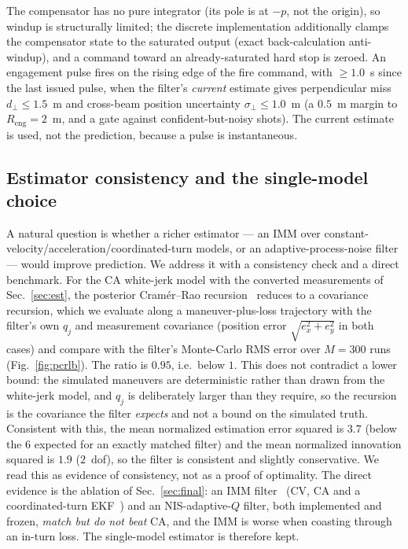 \documentclass[conference]{IEEEtran}
\begin{document}
The compensator has no pure integrator (its pole is at $-p$, not the origin), so windup is structurally limited; the discrete implementation additionally clamps the compensator state to the saturated output (exact back-calculation anti-windup), and a command toward an already-saturated hard stop is zeroed. An engagement pulse fires on the rising edge of the fire command, with $\ge1.0$~s since the last issued pulse, when the filter's \emph{current} estimate gives perpendicular miss $d_\perp\le1.5$~m and cross-beam position uncertainty $\sigma_\perp\le1.0$~m (a $0.5$~m margin to $R_{\mathrm{eng}}=2$~m, and a gate against confident-but-noisy shots). The current estimate is used, not the prediction, because a pulse is instantaneous.

\subsection{Estimator consistency and the single-model choice}\label{sec:opt}
A natural question is whether a richer estimator --- an IMM over constant-velocity/acceleration/coordinated-turn models, or an adaptive-process-noise filter --- would improve prediction. We address it with a consistency check and a direct benchmark. For the CA white-jerk model with the converted measurements of Sec.~\ref{sec:est}, the posterior Cram\'er--Rao recursion~\cite{tichavsky} reduces to a covariance recursion, which we evaluate along a maneuver-plus-loss trajectory with the filter's own $q_j$ and measurement covariance (position error $\sqrt{e_x^2+e_y^2}$ in both cases) and compare with the filter's Monte-Carlo RMS error over $M=300$ runs (Fig.~\ref{fig:pcrlb}). The ratio is $0.95$, i.e.\ below $1$. This does not contradict a lower bound: the simulated maneuvers are deterministic rather than drawn from the white-jerk model, and $q_j$ is deliberately larger than they require, so the recursion is the covariance the filter \emph{expects} and not a bound on the simulated truth. Consistent with this, the mean normalized estimation error squared is $3.7$ (below the $6$ expected for an exactly matched filter) and the mean normalized innovation squared is $1.9$ ($2$~dof), so the filter is consistent and slightly conservative. We read this as evidence of consistency, not as a proof of optimality. The direct evidence is the ablation of Sec.~\ref{sec:final}: an IMM filter~\cite{blom} (CV, CA and a coordinated-turn EKF~\cite{li}) and an NIS-adaptive-$Q$ filter, both implemented and frozen, \emph{match but do not beat} CA, and the IMM is worse when coasting through an in-turn loss. The single-model estimator is therefore kept.
\end{document}
